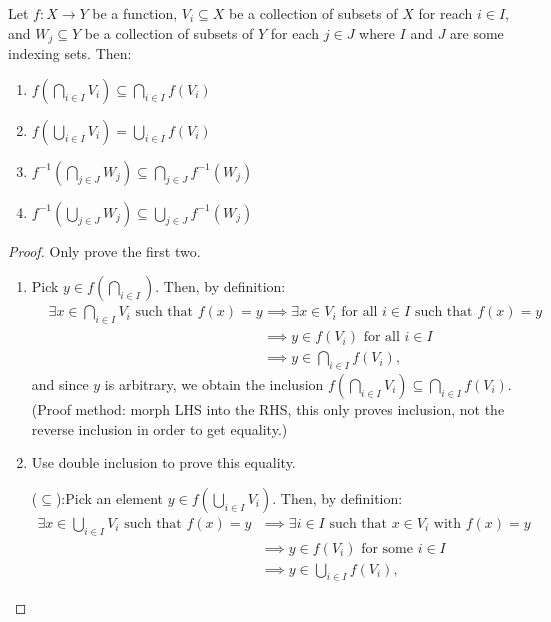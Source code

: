 \begin{proposition} Let $f : X \to Y$ be a function, $V_i \subseteq X$ be a collection of subsets of $X$ for reach $i \in I$, and $W_j \subseteq Y$ be a collection of subsets of $Y$ for each $j \in J$ where $I$ and $J$ are some indexing sets. Then:

    \begin{enumerate}
        \item $f(\bigcap_{i \in I} V_i) \subseteq \bigcap_{i \in I} f(V_i)$
        \item $f(\bigcup_{i \in I} V_i) = \bigcup_{i \in I} f(V_i)$
        \item $f^{-1}(\bigcap_{j \in J} W_j) \subseteq \bigcap_{j \in J} f^{-1}(W_j)$
        \item $f^{-1}(\bigcup_{j \in J} W_j) \subseteq \bigcup_{j \in J} f^{-1}(W_j)$
    \end{enumerate}

    \begin{proof} Only prove the first two.
        \begin{enumerate}
            \item Pick $y \in f(\bigcap_{i \in I})$. Then, by definition:
                \begin{align*}
                    &\exists x \in \bigcap_{i\in I} V_i \text{ such that } f(x) = y
                    &&\implies \exists x \in V_i \text{ for all } i \in I \text{ such that } f(x) = y \\
                    & &&\implies y \in f(V_i) \text{ for all } i \in I \\
                    & &&\implies y \in \bigcap_{i\in I} f(V_i),
                \end{align*}
                \noindent and since $y$ is arbitrary, we obtain the inclusion $f(\bigcap_{i \in I} V_i) \subseteq \bigcap_{i \in I} f(V_i)$. (Proof method: morph LHS into the RHS, this only proves inclusion, not the reverse inclusion in order to get equality.)
            \item Use double inclusion to prove this equality.

                ($\subseteq$):\quad Pick an element $y \in f(\bigcup_{i \in I} V_i)$. Then, by definition:
                \begin{align*}
                    \exists x \in \bigcup_{i\in I} V_i \text{ such that } f(x) = y
                    & &&\implies \exists i \in I \text{ such that } x \in V_i \text{ with } f(x) = y \\
                    & &&\implies y \in f(V_i) \text{ for some } i \in I \\
                    & &&\implies y \in \bigcup_{i\in I} f(V_i),
                \end{align*}


\end{enumerate}
\end{proof}
\end{proposition}
